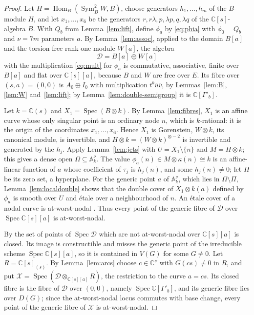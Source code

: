 \documentclass{amsart}
\theoremstyle{definition}
\theoremstyle{remark}
\numberwithin{equation}{section}
\newcommand{\C}{\mathbb{C}}
\newcommand{\A}{\mathbb{A}}
\DeclareMathOperator{\Hom}{Hom}
\DeclareMathOperator{\Spec}{Spec}
\DeclareMathOperator{\Sym}{Sym}
\begin{document}
\begin{proof}
Let $H=\Hom_B(\Sym^2_BW,B)$, choose generators $h_1,\dots,h_m$ of the $B$-module $H$, and let $x_1,\dots,x_6$ be the generators $r,r\lambda,p,\lambda p,q,\lambda q$ of the $\C[s]$-algebra $B$. With $Q_b$ from Lemma~\ref{lem:lift}, define $\phi_a$ by \eqref{eq:phia} with $\phi_0=Q_b$ and $\nu=7m$ parameters $a$. By Lemma~\ref{lem:assoc}, applied to the domain $B[a]$ and the torsion-free rank one module $W[a]$, the algebra
\[
\mathcal D=B[a]\oplus W[a]
\]
with the multiplication \eqref{eq:mult} for $\phi_a$ is commutative, associative, finite over $B[a]$ and flat over $\C[s][a]$, because $B$ and $W$ are free over $E$. Its fibre over $(s,a)=(0,0)$ is $A_0\oplus I_0$ with multiplication $t^b\bar u\bar v$, by Lemmas~\ref{lem:B}, \ref{lem:W} and~\ref{lem:lift}; by Lemma~\ref{lem:double-semigroup} it is $\C[\Gamma'_b]$.

Let $k=\C(s)$ and $X_1=\Spec(B\otimes k)$. By Lemma~\ref{lem:fibres}, $X_1$ is an affine curve whose only singular point is an ordinary node $n$, which is $k$-rational: it is the origin of the coordinates $x_1,\dots,x_6$. Hence $X_1$ is Gorenstein, $W\otimes k$, its canonical module, is invertible, and $H\otimes k=(W\otimes k)^{\otimes-2}$ is invertible and generated by the $h_j$. Apply Lemma~\ref{lem:jets} with $U=X_1\setminus\{n\}$ and $M=H\otimes k$; this gives a dense open $\Omega\subseteq\A^\nu_k$. The value $\phi_a(n)\in M\otimes\kappa(n)\cong k$ is an affine-linear function of $a$ whose coefficient of $\tau_j$ is $h_j(n)$, and some $h_j(n)\ne0$; let $\Pi$ be its zero set, a hyperplane. For the generic point $a$ of $\A^\nu_k$, which lies in $\Omega\setminus\Pi$, Lemma~\ref{lem:localdouble} shows that the double cover of $X_1\otimes k(a)$ defined by $\phi_a$ is smooth over $U$ and \'etale over a neighbourhood of $n$. An \'etale cover of a nodal curve is at-worst-nodal \cite[Lemma~53.20.6 (Tag~0C5C)]{Sta}. Thus every point of the generic fibre of $\mathcal D$ over $\Spec\C[s][a]$ is at-worst-nodal.

By \cite[Lemma~53.20.5 (Tag~0DSC)]{Sta} the set of points of $\Spec\mathcal D$ which are not at-worst-nodal over $\C[s][a]$ is closed. Its image is constructible and misses the generic point of the irreducible scheme $\Spec\C[s][a]$, so it is contained in $V(G)$ for some $G\ne0$. Let $R=\C[s]_{(s)}$. By Lemma~\ref{lem:arcs} choose $c\in\C^\nu$ with $G(cs)\ne0$ in $R$, and put $\mathcal X=\Spec(\mathcal D\otimes_{\C[s][a]}R)$, the restriction to the curve $a=cs$. Its closed fibre is the fibre of $\mathcal D$ over $(0,0)$, namely $\Spec\C[\Gamma'_b]$, and its generic fibre lies over $D(G)$; since the at-worst-nodal locus commutes with base change, every point of the generic fibre of $\mathcal X$ is at-worst-nodal.
\end{proof}
\end{document}
